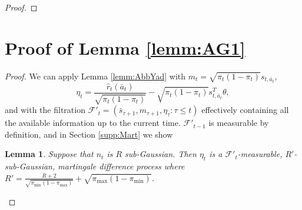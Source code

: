 \documentclass{article}
\newtheorem{lemma}{Lemma}
\begin{document}
\begin{appendices}
\begin{proof}
\end{proof}

\section{Proof of Lemma \ref{lemm:AG1}}
\label{supp:lemmAG1}
\begin{proof}
We can apply Lemma \ref{lemm:AbbYad} with $m_t = \sqrt{\pi_t(1-\pi_t)}s_{t,\bar{a}_t}$, 
\[
\eta_t = \frac{\hat{r}_t(\bar{a}_t)}{\sqrt{\pi_t(1-\pi_t)}} - \sqrt{\pi_t(1-\pi_t)} s_{t,\bar{a}_t}^T \theta,
\]
and with the filtration $\mathcal{F}'_t = (\bar{s}_{\tau+1}, m_{\tau + 1}, \eta_\tau: \tau \leq t)$ effectively containing all the available information up to the current time. $\mathcal{F}'_{t-1}$ is measurable by definition, and in Section \ref{supp:Mart} we show 
\begin{lemma}\label{lemm:Mart}
Suppose that $n_t$ is $R$ sub-Gaussian. Then $\eta_t$ is a $\mathcal{F}'_{t}$-measurable, $R'$-sub-Gaussian, martingale difference process where $R' = \frac{R+2}{\sqrt{\pi_{\min}(1-\pi_{\max})}} +\sqrt{\pi_{\max}(1-\pi_{\min})}$.
\end{lemma}



\end{proof}
\end{appendices}
\end{document}

